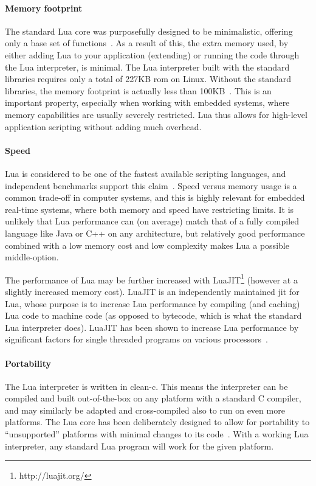 \paragraph{Memory footprint}
The standard Lua core was purposefully designed to be minimalistic, offering only a base set of functions~\cite{article:the_implementation_of_lua}. As a result of this, the extra memory used, by either adding Lua to your application (extending) or running the code through the Lua interpreter, is minimal. The Lua interpreter built with the standard libraries requires only a total of 227KB \gls{rom} on Linux. Without the standard libraries, the memory footprint is actually less than 100KB~\cite{website:lua_about}. This is an important property, especially when working with embedded systems, where memory capabilities are usually severely restricted. Lua thus allows for high-level application scripting without adding much overhead.

\paragraph{Speed}
Lua is considered to be one of the fastest available scripting languages, and independent benchmarks support this claim~\cite{website:computer_language_benchmarks_game}. Speed versus memory usage is a common trade-off in computer systems, and this is highly relevant for embedded real-time systems, where both memory and speed have restricting limits. It is unlikely that Lua performance can (on average) match that of a fully compiled language like Java or C++ on any architecture, but relatively good performance combined with a low memory cost and low complexity makes Lua a possible middle-option.

The performance of Lua may be further increased with LuaJIT\footnote{http://luajit.org/} (however at a slightly increased memory cost). LuaJIT is an independently maintained \gls{jit} for Lua, whose purpose is to increase Lua performance by compiling (and caching) Lua code to machine code (as opposed to bytecode, which is what the standard Lua interpreter does). LuaJIT has been shown to increase Lua performance by significant factors for single threaded programs on various processors~\cite{website:luajit_performance}. 

\paragraph{Portability}
The Lua interpreter is written in \gls{clean-c}. This means the interpreter can be compiled and built out-of-the-box on any platform with a standard C compiler, and may similarly be adapted and cross-compiled also to run on even more platforms. The Lua core has been deliberately designed to allow for portability to ``unsupported'' platforms with minimal changes to its code~\cite{chapter:porting_lua_microcontroller}. With a working Lua interpreter, any standard Lua program will work for the given platform.

